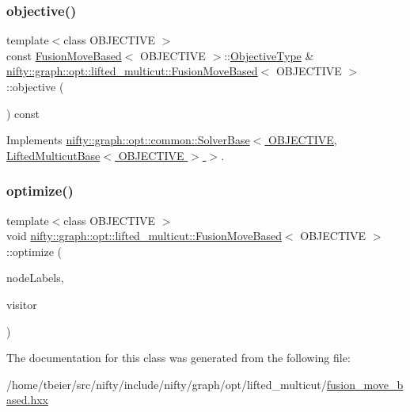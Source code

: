 \subsubsection{\texorpdfstring{objective()}{objective()}}
{\footnotesize\ttfamily template$<$class O\+B\+J\+E\+C\+T\+I\+VE $>$ \\
const \hyperlink{classnifty_1_1graph_1_1opt_1_1lifted__multicut_1_1FusionMoveBased}{Fusion\+Move\+Based}$<$ O\+B\+J\+E\+C\+T\+I\+VE $>$\+::\hyperlink{classnifty_1_1graph_1_1opt_1_1lifted__multicut_1_1FusionMoveBased_a9cb2fb9caff3dac87f0d43cf757e676c}{Objective\+Type} \& \hyperlink{classnifty_1_1graph_1_1opt_1_1lifted__multicut_1_1FusionMoveBased}{nifty\+::graph\+::opt\+::lifted\+\_\+multicut\+::\+Fusion\+Move\+Based}$<$ O\+B\+J\+E\+C\+T\+I\+VE $>$\+::objective (\begin{DoxyParamCaption}{ }\end{DoxyParamCaption}) const\hspace{0.3cm}{\ttfamily [virtual]}}



Implements \hyperlink{classnifty_1_1graph_1_1opt_1_1common_1_1SolverBase_a55e9eb645c07d6e0782ebfb990ab3c84}{nifty\+::graph\+::opt\+::common\+::\+Solver\+Base$<$ O\+B\+J\+E\+C\+T\+I\+V\+E, Lifted\+Multicut\+Base$<$ O\+B\+J\+E\+C\+T\+I\+V\+E $>$ $>$}.

\mbox{\label{classnifty_1_1graph_1_1opt_1_1lifted__multicut_1_1FusionMoveBased_ac637f35b00a9125597adee3d1a88b3d1}} 
\subsubsection{\texorpdfstring{optimize()}{optimize()}}
{\footnotesize\ttfamily template$<$class O\+B\+J\+E\+C\+T\+I\+VE $>$ \\
void \hyperlink{classnifty_1_1graph_1_1opt_1_1lifted__multicut_1_1FusionMoveBased}{nifty\+::graph\+::opt\+::lifted\+\_\+multicut\+::\+Fusion\+Move\+Based}$<$ O\+B\+J\+E\+C\+T\+I\+VE $>$\+::optimize (\begin{DoxyParamCaption}\item[{\hyperlink{classnifty_1_1graph_1_1opt_1_1lifted__multicut_1_1FusionMoveBased_a927c0df1d813436185e85af1714f1fbe}{Node\+Labels\+Type} \&}]{node\+Labels,  }\item[{\hyperlink{classnifty_1_1graph_1_1opt_1_1lifted__multicut_1_1FusionMoveBased_af4920e3b541fb9b40fb17c4a73f500b5}{Visitor\+Base\+Type} $\ast$}]{visitor }\end{DoxyParamCaption})\hspace{0.3cm}{\ttfamily [virtual]}}



The documentation for this class was generated from the following file\+:\begin{DoxyCompactItemize}
\item 
/home/tbeier/src/nifty/include/nifty/graph/opt/lifted\+\_\+multicut/\hyperlink{lifted__multicut_2fusion__move__based_8hxx}{fusion\+\_\+move\+\_\+based.\+hxx}\end{DoxyCompactItemize}
